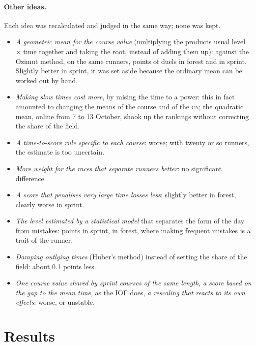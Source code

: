 \documentclass[11pt,a4paper]{article}
\newcommand{\CN}{\textsc{cn}}
\begin{document}
\paragraph{Other ideas.} Each idea was recalculated and judged in the same way; none was kept.
\begin{itemize}
  \item \emph{A geometric mean for the course value} (multiplying the products usual level $\times$ time together and taking the root, instead of adding them up): against the Ozimut method, on the same runners, \NgeoVarF{} points of duels in forest and \NgeoVarS{} in sprint. Slightly better in sprint, it was set aside because the ordinary mean can be worked out by hand.
  \item \emph{Making slow times cost more}, by raising the time to a power: this in fact amounted to changing the means of the course and of the \CN; the quadratic mean, online from 7 to 13 October, shook up the rankings without correcting the share of the field.
  \item \emph{A time-to-score rule specific to each course}: worse; with twenty or so runners, the estimate is too uncertain.
  \item \emph{More weight for the races that separate runners better}: no significant difference.
  \item \emph{A score that penalises very large time losses less}: slightly better in forest, clearly worse in sprint.
  \item \emph{The level estimated by a statistical model} that separates the form of the day from mistakes: \NmleS{} points in sprint, \NmleF{} in forest, where making frequent mistakes is a trait of the runner.
  \item \emph{Damping outlying times} (Huber's method) instead of setting the share of the field: about 0.1 points less.
  \item \emph{One course value shared by sprint courses of the same length}, \emph{a score based on the gap to the mean time}, as the IOF does, \emph{a rescaling that reacts to its own effects}: worse, or unstable.
\end{itemize}

\section{Results}
\end{document}
